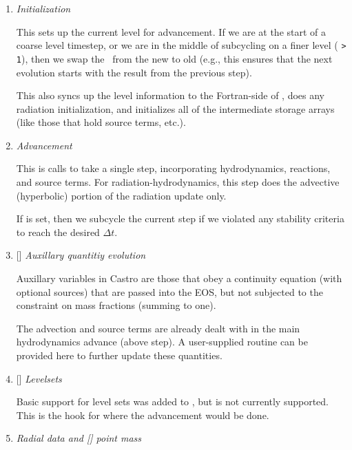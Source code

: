 \begin{enumerate}
\item {\em Initialization} 

  This sets up the current level for advancement.  If we are at the
  start of a coarse level timestep, or we are in the middle of
  subcycling on a finer level ( {\tt > 1}), then
  we swap the \statedata\ from the new to old (e.g., this ensures that
  the next evolution starts with the result from the previous step).

  This also syncs up the level information to the Fortran-side of
  \castro, does any radiation initialization, and initializes all of
  the intermediate storage arrays (like those that hold source terms,
  etc.).

\item {\em Advancement} 

  This is calls  to take a single step,
  incorporating hydrodynamics, reactions, and source terms.  For
  radiation-hydrodynamics, this step does the advective (hyperbolic)
  portion of the radiation update only.




  If  is set, then we subcycle the current
  step if we violated any stability criteria to reach the desired
  $\Delta t$. 

\item {[]} {\em Auxillary quantitiy evolution} 

  Auxillary variables in Castro are those that obey a continuity
  equation (with optional sources) that are passed into the EOS, but
  not subjected to the constraint on mass fractions (summing to one).

  The advection and source terms are already dealt with in the 
  main hydrodynamics advance (above step).  A user-supplied routine
   can be provided here to further update these
  quantities.
  
\item {[]} {\em Levelsets} 

  Basic support for level sets was added to \castro, but is not currently
  supported.  This is the hook for where the advancement would be done.

\item {\em Radial data and {\rm[]} point mass} 


\end{enumerate}
